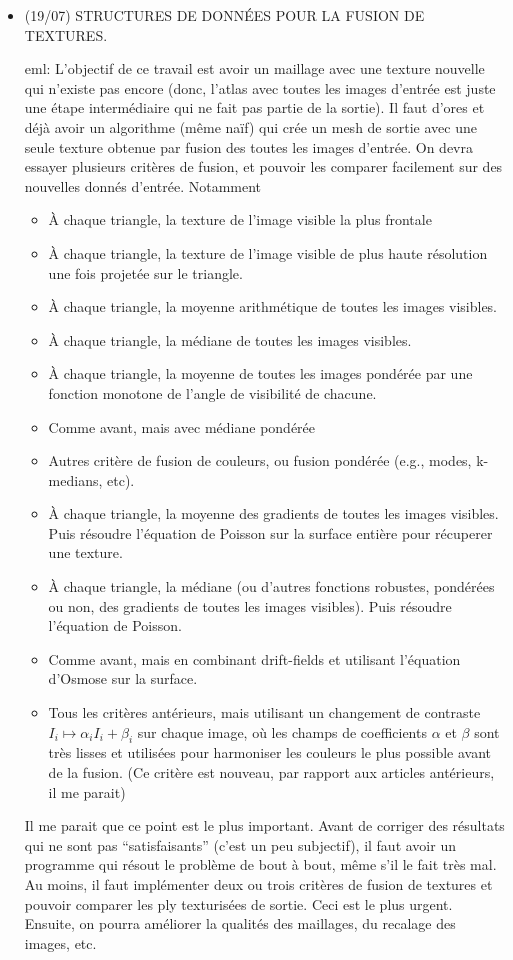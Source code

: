 \documentclass{article}
\newcommand{\mnhrdt}[1]{{\footnotesize\textcolor[rgb]{0.8,0.5,0.5}{eml: #1}}}
\begin{document}
\begin{itemize}
\item (19/07) STRUCTURES DE DONNÉES POUR LA FUSION DE TEXTURES.  \mnhrdt{L'objectif de ce
travail est avoir un maillage avec une texture nouvelle qui n'existe
pas encore (donc, l'atlas avec toutes les images d'entrée est
juste une étape intermédiaire qui ne fait pas partie de la
sortie).  Il faut d'ores et déjà avoir un algorithme (même
naïf) qui crée un mesh de sortie avec une seule texture
obtenue par fusion des toutes les images d'entrée.  On devra
essayer plusieurs critères de fusion, et pouvoir les comparer
facilement sur des nouvelles donnés d'entrée.  Notamment
\begin{itemize}
	\item À chaque triangle, la texture de l'image visible la plus frontale
	\item À chaque triangle, la texture de l'image visible de plus haute
		résolution une fois projetée sur le triangle.
	\item À chaque triangle, la moyenne arithmétique de toutes les
		images visibles.
	\item À chaque triangle, la médiane de toutes les images visibles.
	\item À chaque triangle, la moyenne de toutes les images pondérée par
		une fonction monotone de l'angle de visibilité de chacune.
	\item Comme avant, mais avec médiane pondérée
	\item Autres critère de fusion de couleurs, ou fusion pondérée (e.g.,
		modes, k-medians, etc).
	\item À chaque triangle, la moyenne des gradients de toutes les
		images visibles.  Puis résoudre l'équation de Poisson sur la
		surface entière pour récuperer une texture.
	\item À chaque triangle, la médiane (ou d'autres fonctions robustes,
		pondérées ou non,  des gradients de toutes les images
		visibles).  Puis résoudre l'équation de Poisson.
	\item Comme avant, mais en combinant drift-fields et utilisant
		l'équation d'Osmose sur la surface.
	\item Tous les critères antérieurs, mais utilisant un changement de
		contraste~$I_i\mapsto\alpha_i I_i+\beta_i$ sur chaque image,
		où les champs de coefficients $\alpha$ et $\beta$ sont très
		lisses et utilisées pour harmoniser les couleurs le plus
		possible avant de la fusion.  (Ce critère est nouveau, par
		rapport aux articles antérieurs, il me parait)
\end{itemize}
Il me parait que ce point est le plus important.  Avant de corriger des
résultats qui ne sont pas ``satisfaisants'' (c'est un peu subjectif), il faut
avoir un programme qui résout le problème de bout à bout, même s'il le fait
très mal.  Au moins, il faut implémenter deux ou trois critères de fusion de
textures et pouvoir comparer les ply texturisées de sortie.  Ceci est le plus
urgent.  Ensuite, on pourra améliorer la qualités des maillages, du recalage
des images, etc.
}
\end{itemize}
\end{document}
